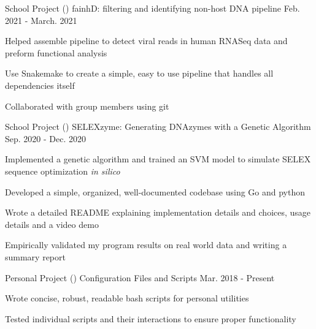 \begin{cventries}
	\cventry
    {School Project ()}
        {fainhD: filtering and identifying non-host DNA pipeline}
      {Feb. 2021 - March. 2021}
      {}
      {
        \begin{cvitems}
        \item{Helped assemble pipeline to detect viral reads in human RNASeq data and preform functional analysis}
        \item{Use Snakemake to create a simple, easy to use pipeline that handles all dependencies itself}
        \item{Collaborated with group members using git}
        \end{cvitems}
      }
	\cventry
      {School Project ()}
      {SELEXzyme: Generating DNAzymes with a Genetic Algorithm}
      {Sep. 2020 - Dec. 2020}
      {}
      {
        \begin{cvitems}
          \item{Implemented a genetic algorithm and trained an SVM model to simulate SELEX sequence optimization \textit{in silico}}
          \item{Developed a simple, organized, well-documented codebase using Go and python}
          \item{Wrote a detailed README explaining implementation details and choices, usage details and a video demo}
          \item{Empirically validated my program results on real world data and writing a summary report}
        \end{cvitems}
      }
	\cventry
      {Personal Project ()}
      {Configuration Files and Scripts}
      {Mar. 2018 - Present}
      {}
      {
        \begin{cvitems}
          \item{Wrote concise, robust, readable bash scripts for personal utilities}
          \item{Tested individual scripts and their interactions to ensure proper functionality}
        \end{cvitems}
      }

\end{cventries}
